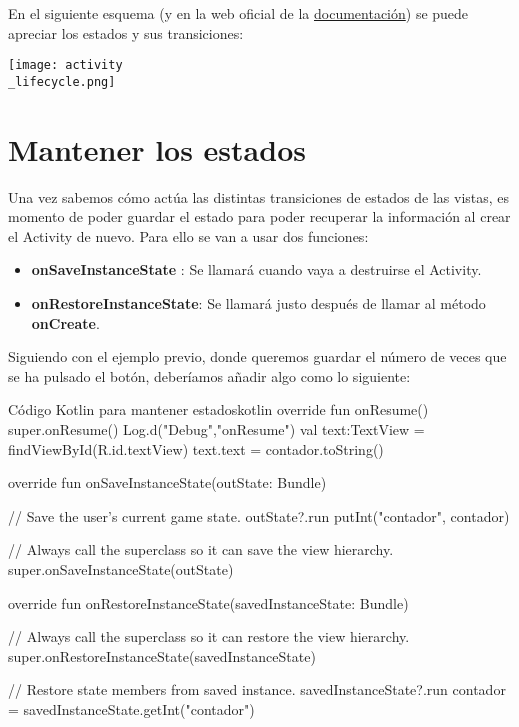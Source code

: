 En el siguiente esquema (y en la web oficial de la \href{https://developer.android.com/guide/components/activities/activity-lifecycle#alc}{documentación}) se puede apreciar los estados y sus transiciones:

\begin{center}
    \texttt{[image: activity\\\_lifecycle.png]}
\end{center}



\section{Mantener los estados}

Una vez sabemos cómo actúa las distintas transiciones de estados de las vistas, es momento de poder guardar el estado para poder recuperar la información al crear el Activity de nuevo. Para ello se van a usar dos funciones:

\begin{itemize}
    \item \textbf{onSaveInstanceState} : Se llamará cuando vaya a destruirse el Activity.
    \item \textbf{onRestoreInstanceState}: Se llamará justo después de llamar al método \textbf{onCreate}.
\end{itemize}

Siguiendo con el ejemplo previo, donde queremos guardar el número de veces que se ha pulsado el botón, deberíamos añadir algo como lo siguiente:

\begin{mycode}{Código Kotlin para mantener estados}{kotlin}{}
override fun onResume(){
    super.onResume()
    Log.d("Debug","onResume")
    val text:TextView = findViewById(R.id.textView)
    text.text = contador.toString()
}

override fun onSaveInstanceState(outState: Bundle) {
    // Save the user's current game state.
    outState?.run {
        putInt("contador", contador)
    }

    // Always call the superclass so it can save the view hierarchy.
    super.onSaveInstanceState(outState)
}

override fun onRestoreInstanceState(savedInstanceState: Bundle) {
    // Always call the superclass so it can restore the view hierarchy.
    super.onRestoreInstanceState(savedInstanceState)

    // Restore state members from saved instance.
    savedInstanceState?.run {
        contador = savedInstanceState.getInt("contador")
    }
}
\end{mycode}